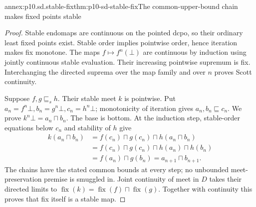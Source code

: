 \begin{annexitem}{annex:p10.sd.stable-fix}{thm:p10-sd-stable-fix}{The common-upper-bound chain makes fixed points stable}
\begin{proof}
Stable endomaps are continuous on the pointed dcpo, so their ordinary
least fixed points exist. Stable order implies pointwise order, hence
iteration makes fix monotone. The maps \(f\mapsto f^n(\bot)\) are
continuous by induction using jointly continuous stable evaluation.
Their increasing pointwise supremum is fix. Interchanging the directed
suprema over the map family and over \(n\) proves Scott continuity.

Suppose \(f,g\sqsubseteq_s h\). Their stable meet \(k\) is pointwise.
Put \(a_n=f^n\bot,b_n=g^n\bot,c_n=h^n\bot\); monotonicity of
iteration gives \(a_n,b_n\sqsubseteq c_n\). We prove
\(k^n\bot=a_n\sqcap b_n\). The base is bottom. At the induction
step, stable-order equations below \(c_n\) and stability of \(h\) give
\[
 \begin{split}
 k(a_n\sqcap b_n)
 &=f(c_n)\sqcap g(c_n)\sqcap h(a_n\sqcap b_n)\\
 &=f(c_n)\sqcap g(c_n)\sqcap h(a_n)\sqcap h(b_n)\\
 &=f(a_n)\sqcap g(b_n)=a_{n+1}\sqcap b_{n+1}.
 \end{split}
\]
The chains have the stated common bounds at every step; no unbounded
meet-preservation premise is smuggled in. Joint continuity of meet in
\(D\) takes their directed limits to
\(\operatorname{fix}(k)=\operatorname{fix}(f)\sqcap\operatorname{fix}(g)\).
Together with continuity this proves that fix itself is a stable map.
\end{proof}
\end{annexitem}

